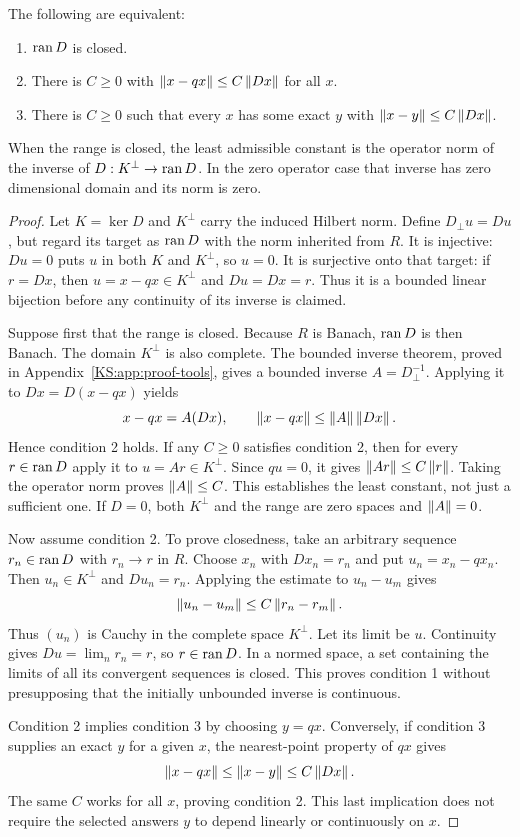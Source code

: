 \begin{KStheorem}\label{KS:KS43}
The following are equivalent:
\begin{enumerate}
\item \(\operatorname{ran} D\) is closed.
\item There is \(C\ge0\) with \(\left\lVert x-qx\right\rVert\le C\left\lVert Dx\right\rVert\) for all \(x\).
\item There is \(C\ge0\) such that every \(x\) has some exact \(y\) with \(\left\lVert x-y\right\rVert\le C\left\lVert Dx\right\rVert\).
\end{enumerate}
When the range is closed, the least admissible constant is the operator norm of the inverse of \(D:K^\perp\to\operatorname{ran} D\). In the zero operator case that inverse has zero dimensional domain and its norm is zero.
\end{KStheorem}
\begin{proof}
Let $K=\ker D$ and $K^\perp$ carry the induced Hilbert norm. Define $D_\perp u=Du$, but regard its target as $\operatorname{ran} D$ with the norm inherited from $R$. It is injective: $Du=0$ puts $u$ in both $K$ and $K^\perp$, so $u=0$. It is surjective onto that target: if $r=Dx$, then $u=x-qx\in K^\perp$ and $Du=Dx=r$. Thus it is a bounded linear bijection before any continuity of its inverse is claimed.

Suppose first that the range is closed. Because $R$ is Banach, $\operatorname{ran} D$ is then Banach. The domain $K^\perp$ is also complete. The bounded inverse theorem, proved in Appendix~\ref{KS:app:proof-tools}, gives a bounded inverse $A=D_\perp^{-1}$. Applying it to $Dx=D(x-qx)$ yields
\[
 x-qx=A(Dx),\qquad \left\lVert x-qx\right\rVert\le\left\lVert A\right\rVert\left\lVert Dx\right\rVert.
\]
Hence condition 2 holds. If any $C\ge0$ satisfies condition 2, then for every $r\in\operatorname{ran} D$ apply it to $u=Ar\in K^\perp$. Since $qu=0$, it gives $\left\lVert Ar\right\rVert\le C\left\lVert r\right\rVert$. Taking the operator norm proves $\left\lVert A\right\rVert\le C$. This establishes the least constant, not just a sufficient one. If $D=0$, both $K^\perp$ and the range are zero spaces and $\left\lVert A\right\rVert=0$.

Now assume condition 2. To prove closedness, take an arbitrary sequence $r_n\in\operatorname{ran} D$ with $r_n\to r$ in $R$. Choose $x_n$ with $Dx_n=r_n$ and put $u_n=x_n-qx_n$. Then $u_n\in K^\perp$ and $Du_n=r_n$. Applying the estimate to $u_n-u_m$ gives
\[
 \left\lVert u_n-u_m\right\rVert\le C\left\lVert r_n-r_m\right\rVert.
\]
Thus $(u_n)$ is Cauchy in the complete space $K^\perp$. Let its limit be $u$. Continuity gives $Du=\lim_n r_n=r$, so $r\in\operatorname{ran} D$. In a normed space, a set containing the limits of all its convergent sequences is closed. This proves condition 1 without presupposing that the initially unbounded inverse is continuous.

Condition 2 implies condition 3 by choosing $y=qx$. Conversely, if condition 3 supplies an exact $y$ for a given $x$, the nearest-point property of $qx$ gives
\[
 \left\lVert x-qx\right\rVert\le\left\lVert x-y\right\rVert\le C\left\lVert Dx\right\rVert.
\]
The same $C$ works for all $x$, proving condition 2. This last implication does not require the selected answers $y$ to depend linearly or continuously on $x$.
\end{proof}
